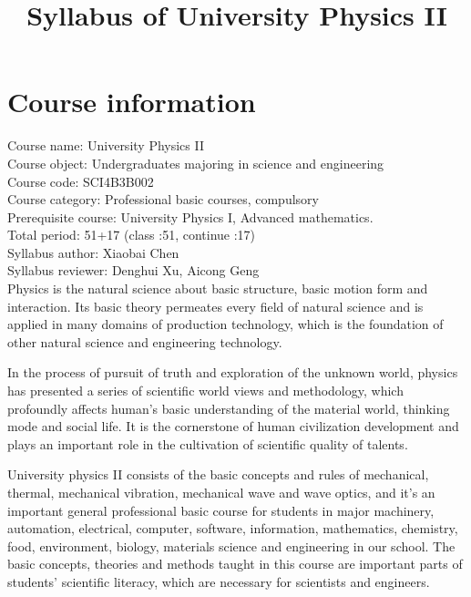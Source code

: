 \documentclass[10pt,a4paper,oneside]{article}
\date{}
\begin{document}
\title{\vspace{-3em}Syllabus of University Physics II\vspace{-2em}}
\maketitle 
\section{Course information}
Course name: University Physics II\\
Course object: Undergraduates majoring in science and engineering\\
Course code: SCI4B3B002\\
Course category: Professional basic courses, compulsory\\
Prerequisite course: University Physics I, Advanced mathematics.\\
Total  period: 51+17 (class :51, continue :17)\\
Syllabus author: Xiaobai Chen\\
Syllabus reviewer: Denghui Xu, Aicong Geng\\


Physics is the natural science about basic structure, basic motion form and interaction. Its basic theory permeates every field of natural science and is applied in many domains of production technology, which is the foundation of other natural science and engineering technology.

In the process of pursuit of truth and exploration of the unknown world, physics has presented a series of scientific world views and methodology, which profoundly affects human's basic understanding of the material world, thinking mode and social life. It is the cornerstone of human civilization development and plays an important role in the cultivation of scientific quality of talents.

University physics II consists of the basic concepts and rules of mechanical, thermal, mechanical vibration, mechanical wave and wave optics, and it's an important general professional basic course for students in major machinery, automation, electrical, computer, software, information, mathematics, chemistry, food, environment, biology, materials science and engineering in our school. The basic concepts, theories and methods taught in this course are important parts of students' scientific literacy, which are necessary for scientists and engineers.
\end{document}
